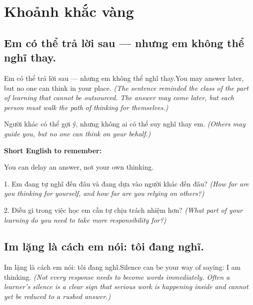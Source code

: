 \chapter{Khoảnh khắc vàng}


\section{Em có thể trả lời sau — nhưng em không thể nghĩ thay.}
\begin{truyen}{Em có thể trả lời sau — nhưng em không thể nghĩ thay.}{You may answer later, but no one can think in your place.}
\textit{(The sentence reminded the class of the part of learning that cannot be outsourced. The answer may come later, but each person must walk the path of thinking for themselves.)}
\end{truyen}

\begin{baihoc}
Người khác có thể gợi ý, nhưng không ai có thể suy nghĩ thay em.
\textit{(Others may guide you, but no one can think on your behalf.)}
\end{baihoc}

\begin{ghinhoanh}
\textbf{Short English to remember:}

You can delay an answer, not your own thinking.

\end{ghinhoanh}

\begin{tuhocnhanh}
1. Em đang tự nghĩ đến đâu và đang dựa vào người khác đến đâu? \textit{(How far are you thinking for yourself, and how far are you relying on others?)}

2. Điều gì trong việc học em cần tự chịu trách nhiệm hơn? \textit{(What part of your learning do you need to take more responsibility for?)}
\end{tuhocnhanh}
\ngancach


\section{Im lặng là cách em nói: tôi đang nghĩ.}
\begin{truyen}{Im lặng là cách em nói: tôi đang nghĩ.}{Silence can be your way of saying: I am thinking.}
\textit{(Not every response needs to become words immediately. Often a learner's silence is a clear sign that serious work is happening inside and cannot yet be reduced to a rushed answer.)}
\end{truyen}

